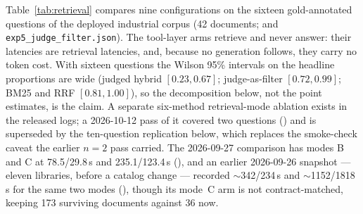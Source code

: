 Table~\ref{tab:retrieval} compares nine configurations on the sixteen
gold-annotated questions of the deployed industrial corpus (42 documents;
 and
\texttt{exp5\_judge\_filter.json}). The tool-layer arms retrieve and never
answer: their latencies are retrieval latencies, and, because no generation
follows, they carry no token cost. With sixteen questions the Wilson 95\%
intervals on the headline proportions are wide (judged hybrid $[0.23, 0.67]$;
judge-as-filter $[0.72, 0.99]$; BM25 and RRF $[0.81, 1.00]$), so the
decomposition below, not the point estimates, is the claim. A separate
six-method retrieval-mode ablation exists in the released logs; a 2026-10-12
pass of it covered two questions
()
and is superseded by the ten-question replication below, which replaces the
smoke-check caveat the earlier $n=2$ pass carried. The 2026-09-27 comparison
has modes B and C at 78.5/29.8\,s and 235.1/123.4\,s
(),
and an earlier 2026-09-26 snapshot --- eleven libraries, before a catalog
change --- recorded $\sim$342/234\,s and $\sim$1152/1818\,s for the same two
modes
(),
though its mode~C arm is not contract-matched, keeping 173 surviving documents
against 36 now.

